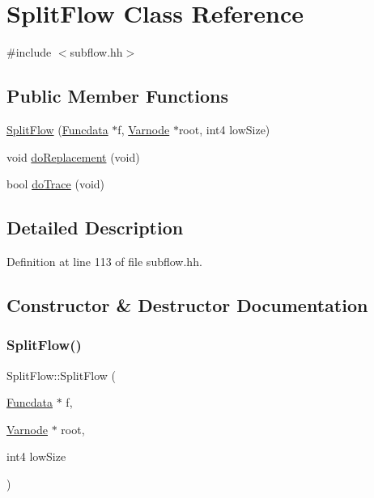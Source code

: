 \hypertarget{class_split_flow}{}\section{Split\+Flow Class Reference}
\label{class_split_flow}


{\ttfamily \#include $<$subflow.\+hh$>$}

\subsection*{Public Member Functions}
\begin{DoxyCompactItemize}
\item 
\mbox{\hyperlink{class_split_flow_abc987d8fcdd199c3407968af7295a182}{Split\+Flow}} (\mbox{\hyperlink{class_funcdata}{Funcdata}} $\ast$f, \mbox{\hyperlink{class_varnode}{Varnode}} $\ast$root, int4 low\+Size)
\item 
void \mbox{\hyperlink{class_split_flow_a2a1fc042a07bb2abb0fd1521df574c2c}{do\+Replacement}} (void)
\item 
bool \mbox{\hyperlink{class_split_flow_a45e3612033f7082f63af36a551f64917}{do\+Trace}} (void)
\end{DoxyCompactItemize}


\subsection{Detailed Description}


Definition at line 113 of file subflow.\+hh.



\subsection{Constructor \& Destructor Documentation}
\mbox{\label{class_split_flow_abc987d8fcdd199c3407968af7295a182}} 
\subsubsection{\texorpdfstring{SplitFlow()}{SplitFlow()}}
{\footnotesize\ttfamily Split\+Flow\+::\+Split\+Flow (\begin{DoxyParamCaption}\item[{\mbox{\hyperlink{class_funcdata}{Funcdata}} $\ast$}]{f,  }\item[{\mbox{\hyperlink{class_varnode}{Varnode}} $\ast$}]{root,  }\item[{int4}]{low\+Size }\end{DoxyParamCaption})}



